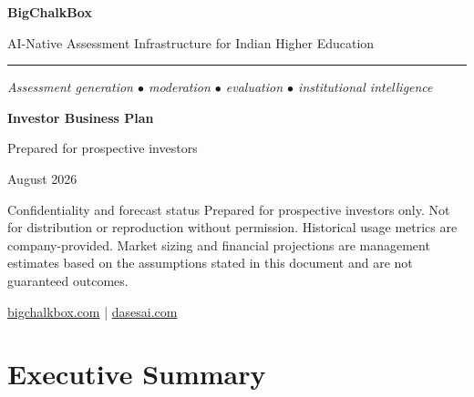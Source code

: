 \documentclass[11pt,a4paper]{article}
\newcommand{\rs}{INR}
\newcommand{\source}[2]{\href{#1}{#2}}
\begin{document}
\begin{titlepage}
  \centering
  \vspace*{1.35cm}
  {\Huge\bfseries\color{deepblue} BigChalkBox\par}
  \vspace{0.28cm}
  {\Large\color{medblue} AI-Native Assessment Infrastructure for Indian Higher Education\par}
  \vspace{0.42cm}
  \rule{10.2cm}{0.7pt}
  \vspace{0.52cm}

  {\large\itshape Assessment generation \(\bullet\) moderation \(\bullet\) evaluation \(\bullet\) institutional intelligence\par}
  \vspace{0.95cm}


  \vspace{1.05cm}
  {\Large\bfseries\color{Ink} Investor Business Plan\par}
  \vspace{0.25cm}
  {\large\color{Muted} Prepared for prospective investors\par}
  \vspace{0.35cm}
  {\large\color{Muted} August 2026\par}
  \vfill
  \begin{callout}{Confidentiality and forecast status}
    Prepared for prospective investors only. Not for distribution or reproduction without permission. Historical usage metrics are company-provided. Market sizing and financial projections are management estimates based on the assumptions stated in this document and are not guaranteed outcomes.
  \end{callout}
  \vspace{0.45cm}
  {\small \source{https://bigchalkbox.com}{bigchalkbox.com} \quad | \quad \source{https://www.dasesai.com}{dasesai.com}}
\end{titlepage}

\tableofcontents
\newpage

\section{Executive Summary}
\end{document}
